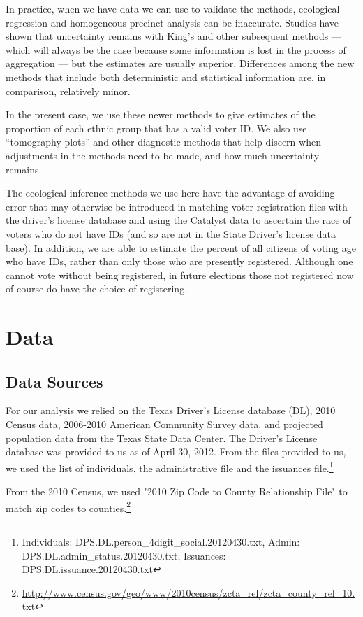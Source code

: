 \documentclass[12pt]{article}
\begin{document}
In practice, when we have data we can use to validate the methods,
ecological regression and homogeneous precinct analysis can be
inaccurate.  Studies have shown that uncertainty remains with King's
and other subsequent methods --- which will always be the case because
some information is lost in the process of aggregation --- but the
estimates are usually superior. Differences among the new methods that
include both deterministic and statistical information are, in
comparison, relatively minor.

In the present case, we use these newer methods to give estimates of
the proportion of each ethnic group that has a valid voter ID.  We
also use ``tomography plots'' and other diagnostic methods that help
discern when adjustments in the methods need to be made, and how much
uncertainty remains.

The ecological inference methods we use here have the advantage of
avoiding error that may otherwise be introduced in matching voter
registration files with the driver's license database and using the
Catalyst data to ascertain the race of voters who do not have IDs (and
so are not in the State Driver's license data base).  In addition, we
are able to estimate the percent of all citizens of voting age who
have IDs, rather than only those who are presently registered.
Although one cannot vote without being registered, in future elections
those not registered now of course do have the choice of registering.

\section{Data}\label{s:data}
\subsection{Data Sources}
For our analysis we relied on the Texas Driver's License database (DL),
2010 Census data, 2006-2010 American Community Survey data, and
projected population data from the Texas State Data Center.  The
Driver's License database was provided to us as of April 30, 2012.
From the files provided to us, we used the list of individuals, the
administrative file and the issuances file.\footnote{Individuals:
  DPS.DL.person\_4digit\_social.20120430.txt, Admin:
  DPS.DL.admin\_status.20120430.txt, Issuances:
  DPS.DL.issuance.20120430.txt}

From the 2010 Census, we used "2010 Zip Code to County Relationship File" to match zip codes to counties.\footnote{\url{http://www.census.gov/geo/www/2010census/zcta_rel/zcta_county_rel_10.txt}}
\end{document}
